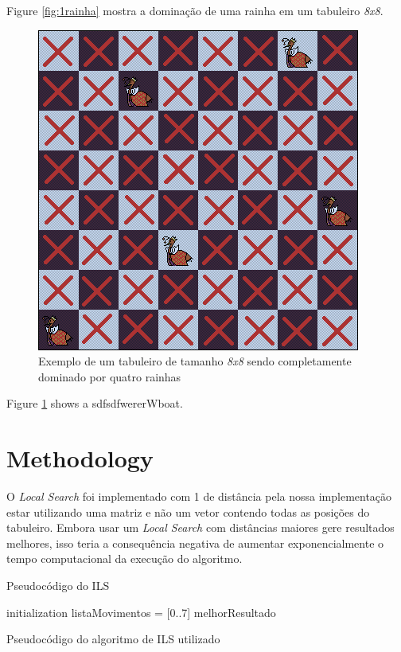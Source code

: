 \documentclass[sigconf]{acmart}
\begin{document}
Figure \ref{fig:1rainha} mostra a dominação de uma rainha em um tabuleiro \textit{8x8}.

\begin{figure}
  \includegraphics[width=\linewidth]{dom2rainha8x8.png}
  \caption{Exemplo de um tabuleiro de tamanho \textit{8x8} sendo completamente dominado por
  quatro rainhas}
  \label{fig:2rainha}
\end{figure}

Figure \ref{fig:2rainha} shows a sdfsdfwererWboat.


\section{Methodology}

O \textit{Local Search} foi implementado com 1 de distância pela nossa implementação estar utilizando uma matriz e não um vetor contendo todas as posições do tabuleiro. Embora usar um \textit{Local Search} com distâncias maiores gere resultados melhores, isso teria a consequência negativa de aumentar exponencialmente o tempo computacional da execução do algoritmo.

Pseudocódigo do ILS
\begin{algorithm}
  initialization\;
  listaMovimentos = [0..7]\;
  melhorResultado\;
  \caption{Pseudocódigo do algoritmo de ILS utilizado}
 \end{algorithm}
\end{document}

